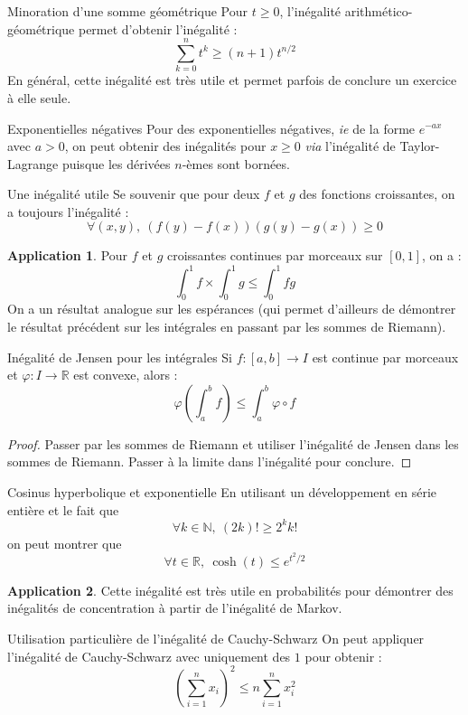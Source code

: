 \documentclass[french]{article}
\newcommand{\N}{\mathbb{N}}
\newcommand{\R}{\mathbb{R}}
\theoremstyle{theorem}
\theoremstyle{definition}
\newtheorem*{app}{Application}
\begin{document}
\begin{lem}{Minoration d'une somme géométrique} Pour $t\geqslant0$, l'inégalité arithmético-géométrique permet d'obtenir l'inégalité : $$\sum_{k=0}^{n}t^k\geqslant(n+1)t^{n/2}$$ En général, cette inégalité est très utile et permet parfois de conclure un exercice à elle seule.
\end{lem}

\begin{lem}{Exponentielles négatives} Pour des exponentielles négatives, \textit{ie} de la forme $e^{-ax}$ avec $a>0$, on peut obtenir des inégalités pour $x\geqslant0$ \textit{via} l'inégalité de Taylor-Lagrange puisque les dérivées $n$-èmes sont bornées.
\end{lem}

\begin{lem}{Une inégalité utile} Se souvenir que pour deux $f$ et $g$ des fonctions croissantes, on a toujours l'inégalité : $$\forall (x,y),\ (f(y)-f(x))(g(y)-g(x))\geqslant0$$
\end{lem}
\begin{app}
	Pour $f$ et $g$ croissantes continues par morceaux sur $[0,1]$, on a : $$\int_{0}^{1}f\times \int_{0}^{1}g\leqslant \int_{0}^{1}fg$$
	On a un résultat analogue sur les espérances (qui permet d'ailleurs de démontrer le résultat précédent sur les intégrales en passant par les sommes de Riemann).
\end{app}

\begin{lem}{Inégalité de Jensen pour les intégrales} Si $f:[a,b]\rightarrow I$ est continue par morceaux et $\varphi:I\rightarrow\R$ est convexe, alors : $$\varphi\left(\int_{a}^{b}f\right)\leqslant\int_{a}^{b}\varphi\circ f$$
\end{lem}
\begin{proof}
	Passer par les sommes de Riemann et utiliser l'inégalité de Jensen dans les sommes de Riemann. Passer à la limite dans l'inégalité pour conclure.
\end{proof}
\begin{lem}{Cosinus hyperbolique et exponentielle} En utilisant un développement en série entière et le fait que $$\forall k\in\N,\ (2k)!\geqslant2^kk!$$ on peut montrer que $$\forall t\in\R,\ \cosh(t)\leqslant e^{t^2/2}$$
\end{lem}
\begin{app}
	Cette inégalité est très utile en probabilités pour démontrer des inégalités de concentration à partir de l'inégalité de Markov.
\end{app}
\begin{lem}{Utilisation particulière de l'inégalité de Cauchy-Schwarz} On peut appliquer l'inégalité de Cauchy-Schwarz avec uniquement des $1$ pour obtenir : $$\left(\sum_{i=1}^{n}x_i\right)^2\leqslant n\sum_{i=1}^{n}x_i^2$$
\end{lem}
\end{document}
